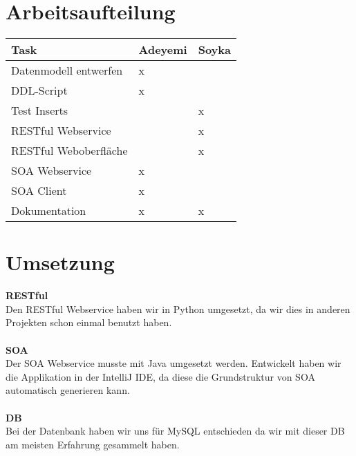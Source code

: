 \documentclass[11pt]{article}
\begin{document}
\section{Arbeitsaufteilung}
\begin{center}
  \begin{tabular}{| l | l | l |}
        \hline
		Task & Adeyemi & Soyka  \\ \hline \hline
    	Datenmodell entwerfen & x & \\ \hline
		DDL-Script & x & \\ \hline
    	Test Inserts  &  & x\\ \hline 
		RESTful Webservice &  & x\\ \hline 
    	RESTful Weboberfläche &  & x\\ \hline 
    	SOA Webservice & x & \\ \hline
		SOA Client & x & \\ \hline
		Dokumentation & x & x\\ \hline

  \end{tabular}
\end{center}

\section{Umsetzung}
\textbf{RESTful}\\
Den RESTful Webservice haben wir in Python umgesetzt, da wir dies in anderen Projekten schon einmal benutzt haben.\\
\\
\textbf{SOA}\\
Der SOA Webservice musste mit Java umgesetzt werden. Entwickelt haben wir die Applikation in der IntelliJ IDE, da diese die Grundstruktur von SOA automatisch generieren kann.\\
\\
\textbf{DB}\\
Bei der Datenbank haben wir uns für MySQL entschieden da wir mit dieser DB am meisten Erfahrung gesammelt haben.
\end{document}
